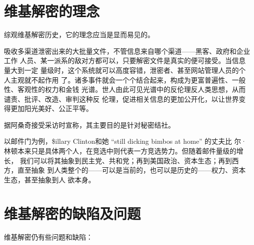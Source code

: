 \section{维基解密的理念}

综观维基解密历史，它的理念应当是显而易见的。

吸收多渠道泄密出来的大批量文件，不管信息来自哪个渠道——黑客、政府和企业工作
人员、某一派系的敌对方都可以，只要解密文件是真实的便可接受。当信息量大到一定
量级时，这个系统就可以高度容错，泄密者、甚至网站管理人员的个人主观就不起作用
了。诸多事件就会一个个结合起来，构成为更富普遍性、一般性、客观性的权力和金钱
光谱。世人由此可见光谱中的反伦理反人类思想，从而谴责、批评、改造、审判这种反
伦理，促进相关信息的更加公开化，以让世界变得更加阳光美好、公正平等。

据阿桑奇接受采访时宣称，其主要目的是针对秘密结社。

以邮件门为例，\$illary Clinton和她 ``still dicking bimbos at home'' 的丈夫比
尔·林顿本来只是具体两个人，在竞选中则代表一方竞选势力。但随着邮件量级的增长，
我们可以将其抽象到民主党、共和党；再到美国政治、资本生态；再到西方，直至抽象
到人类整个的——可以是当前的，也可以是历史的——权力、资本生态，甚至抽象到人
欲本身。

\section{维基解密的缺陷及问题}

维基解密仍有些问题和缺陷：

